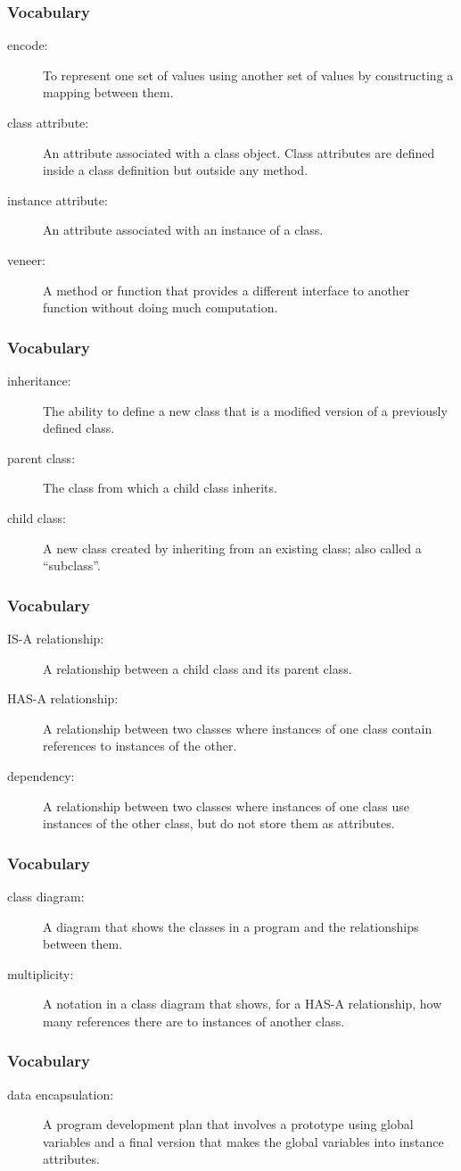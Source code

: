 \documentclass{beamer}
\newcommand{\li}{\item}
\newcommand{\bfr}[1]{\begin{frame}[fragile]\frametitle{{ #1 }}}
\begin{document}
\bfr{Vocabulary}
\begin{description}

\li[encode:]
To represent one set of values using another set of values by constructing a mapping between them.
\li[class attribute:]
An attribute associated with a class object. Class attributes are defined inside a class definition but outside any method.
\li[instance attribute:]
An attribute associated with an instance of a class.
\li[veneer:]
A method or function that provides a different interface to another function without doing much computation.
\end{description}
\end{frame}
\bfr{Vocabulary}
\begin{description}
\li[inheritance:]
The ability to define a new class that is a modified version of a previously defined class.
\li[parent class:]
The class from which a child class inherits.
\li[child class:]
A new class created by inheriting from an existing class; also called a “subclass”.
\end{description}
\end{frame}
\bfr{Vocabulary}
\begin{description}
\li[IS-A relationship:]
A relationship between a child class and its parent class.
\li[HAS-A relationship:]
A relationship between two classes where instances of one class contain references to instances of the other.
\li[dependency:]
A relationship between two classes where instances of one class use instances of the other class, but do not store them as attributes.
\end{description}
\end{frame}
\bfr{Vocabulary}
\begin{description}
\li[class diagram:]
A diagram that shows the classes in a program and the relationships between them.
\li[multiplicity:]
A notation in a class diagram that shows, for a HAS-A relationship, how many references there are to instances of another class.
\end{description}
\end{frame}
\bfr{Vocabulary}
\begin{description}
\li[data encapsulation:]
A program development plan that involves a prototype using global variables and a final version that makes the global variables into instance attributes.
\end{description}
\end{frame}
\end{document}
